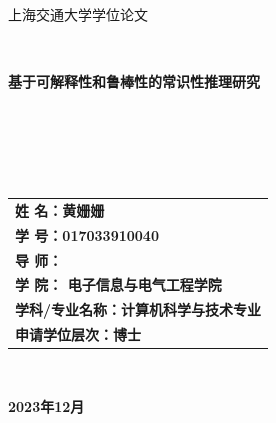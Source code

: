 \documentclass[UTF8,a4paper,12pt]{ctexart}
\numberwithin{equation}{section}
\begin{document}
\thispagestyle{empty}

\renewcommand{\headrulewidth}{0pt}
\begin{figure}[htb] 
 \end{figure}

\begin{center}
{\songti {} 上海交通大学学位论文}
\end{center}
~\\
\begin{center}
\songti {} \textbf{基于可解释性和鲁棒性的常识性推理研究}
\end{center}
~\\
~\\
~\\
~\\
\begin{center}
\heiti {}
\begin{tabular}{l}
\textbf{姓 \quad 名：黄姗姗}\\
\textbf{学 \quad 号：017033910040}\\
\textbf{导 \quad 师：}\\
\textbf{学 \quad 院： 电子信息与电气工程学院}\\
\textbf{学科/专业名称：计算机科学与技术专业}\\
\textbf{申请学位层次：博士}\\
\end{tabular}
\end{center}
~\\
\begin{center}
\songti {} \textbf{2023年12月}
\end{center}
\end{document}
